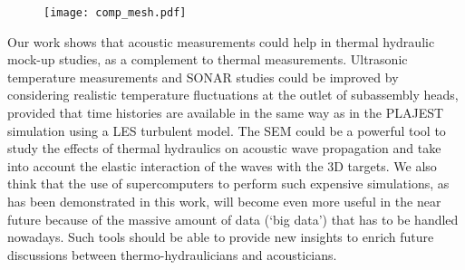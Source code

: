 \begin{figure}[htbp]
    \centerline{\texttt{[image: comp\_mesh.pdf]}}
    \label{fig:comp_mesh}
\end{figure}

\clearpage
\noindent
Our work shows that acoustic measurements could help in thermal hydraulic mock-up studies, as a complement to thermal measurements.
Ultrasonic temperature measurements and SONAR studies could be improved by considering realistic temperature fluctuations at the outlet of subassembly heads,
provided that time histories are available in the same way as in the PLAJEST simulation using a LES turbulent model.
The SEM could be a powerful tool to study the effects of thermal hydraulics on acoustic wave propagation and take into account the elastic interaction of the waves with the 3D targets.
We also think that the use of supercomputers to perform such expensive simulations, as has been demonstrated in this work,
will become even more useful in the near future because of the massive amount of data (`big data') that has to be handled nowadays.
Such tools should be able to provide new insights to enrich future discussions between thermo-hydraulicians and acousticians.

